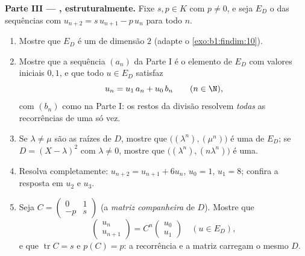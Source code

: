 \begin{problem}
\medskip
\noindent\textbf{Parte III --- ,
estruturalmente.} Fixe $s, p \in K$ com $p \neq 0$, e seja $E_D$ o  das
sequências com $u_{n+2} = s\,u_{n+1} - p\,u_n$ para todo $n$.
\begin{enumerate}[resume]
  \item Mostre que $E_D$ é um  de dimensão $2$
        (adapte o \cref{exo:b1:findim:10}).
  \item Mostre que a sequência $(a_n)$ da Parte I é o elemento de
        $E_D$ com valores iniciais $0, 1$, e que todo $u
        \in E_D$
        satisfaz
        \[
        u_n = u_1\,a_n + u_0\,b_n \qquad (n \in \N),
        \]
        com $(b_n)$ como na Parte I: os restos da divisão resolvem
        \emph{todas} as recorrências de uma só vez.
  \item Se $\lambda \neq \mu$ são as raízes de $D$, mostre que $\bigl((\lambda^n), (\mu^n)\bigr)$ é uma 
        de $E_D$; se $D = (X-\lambda)^2$ com $\lambda \neq 0$, mostre que $\bigl((\lambda^n), (n\lambda^n)\bigr)$ é uma.
  \item Resolva completamente: $u_{n+2} = u_{n+1} + 6u_n$, $u_0 = 1$, $u_1 = 8$; confira
        a resposta em $u_2$ e $u_3$.
  \item Seja $C = \begin{pmatrix} 0 & 1\\ -p & s\end{pmatrix}$ (a \emph{matriz companheira} de $D$). Mostre que
        \[
        \begin{pmatrix} u_{n}\\ u_{n+1}\end{pmatrix}
        = C^n \begin{pmatrix} u_0\\ u_1\end{pmatrix}
        \quad (u \in E_D),
        \]
        e que $\operatorname{tr} C = s$ e $p(C) = p$: a recorrência e a matriz carregam o
        mesmo  $D$.
\end{enumerate}


\end{problem}
